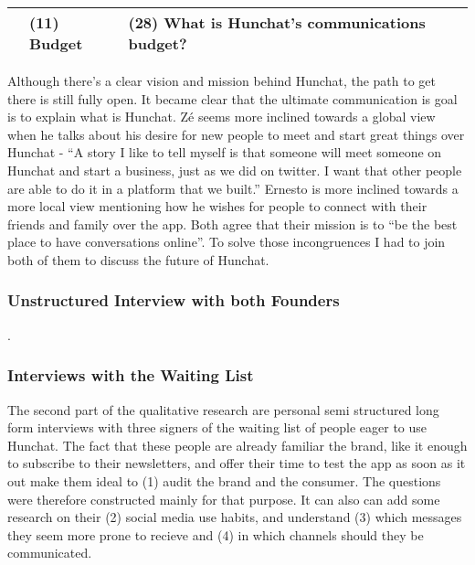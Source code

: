 \documentclass[12pt]{article}
\begin{document}
\begin{table}[htb]
\begin{tabular}{ @{}P{0.15\textwidth}P{0.2\textwidth}P{0.6\textwidth}@{} }
                            & (11) Budget            & (28) What is Hunchat's communications budget?                                                                                                                                                                                                                                                                                                                                                                                    \\ 
\hline
\end{tabular}
\end{table}

Although there's a clear vision and mission behind Hunchat, the path to get there is still fully open. It became clear that the ultimate communication is goal is to explain what is Hunchat. Zé seems more inclined towards a global view when he talks about his desire for new people to meet and start great things over Hunchat - “A story I like to tell myself is that someone will meet someone on Hunchat and start a business, just as we did on twitter. I want that other people are able to do it in a platform that we built.” Ernesto is more inclined towards a more local view mentioning how he wishes for people to connect with their friends and family over the app. Both agree that their mission is to “be the best place to have conversations online”. To solve those incongruences I had to join both of them to discuss the future of Hunchat.

\subsubsection{Unstructured Interview with both Founders}
.
\pagebreak
\subsubsection{Interviews with the Waiting List}
The second part of the qualitative research are personal semi structured long form interviews  with three signers of the waiting list of people eager to use Hunchat. The fact that these people are already familiar the brand, like it enough to subscribe to their newsletters, and offer their time to test the app as soon as it out make them ideal to (1) audit the brand and the consumer. The questions were therefore constructed mainly for that purpose. It can also can add some research on their (2) social media use habits, and understand (3) which messages they seem more prone to recieve and (4) in which channels should they be communicated.
\end{document}
